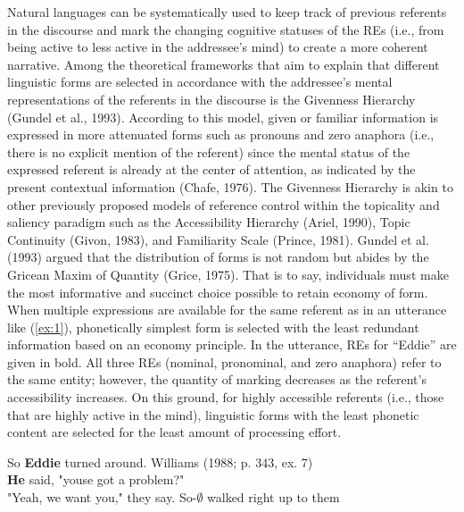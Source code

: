 \documentclass[]{elsarticle} %
\begin{document}
Natural languages can be systematically used to keep track of previous
referents in the discourse and mark the changing cognitive statuses of
the REs (i.e., from being active to less active in the addressee's mind)
to create a more coherent narrative. Among the theoretical frameworks
that aim to explain that different linguistic forms are selected in
accordance with the addressee's mental representations of the referents
in the discourse is the Givenness Hierarchy (Gundel et al., 1993).
According to this model, given or familiar information is expressed in
more attenuated forms such as pronouns and zero anaphora (i.e., there is
no explicit mention of the referent) since the mental status of the
expressed referent is already at the center of attention, as indicated
by the present contextual information (Chafe, 1976). The Givenness
Hierarchy is akin to other previously proposed models of reference
control within the topicality and saliency paradigm such as the
Accessibility Hierarchy (Ariel, 1990), Topic Continuity (Givon, 1983),
and Familiarity Scale (Prince, 1981). Gundel et al. (1993) argued that
the distribution of forms is not random but abides by the Gricean Maxim
of Quantity (Grice, 1975). That is to say, individuals must make the
most informative and succinct choice possible to retain economy of form.
When multiple expressions are available for the same referent as in an
utterance like (\ref{ex:1}), phonetically simplest form is selected with
the least redundant information based on an economy principle. In the
utterance, REs for ``Eddie'' are given in bold. All three REs (nominal,
pronominal, and zero anaphora) refer to the same entity; however, the
quantity of marking decreases as the referent's accessibility increases.
On this ground, for highly accessible referents (i.e., those that are
highly active in the mind), linguistic forms with the least phonetic
content are selected for the least amount of processing effort.

\begin{exe}
    \ex \label{ex:1}
    So \textbf{Eddie} turned around. \hfill Williams (1988; p. 343, ex. 7) \\
\textbf{He} said, "youse got a problem?" \\
"Yeah, we want you," they say.
So-$\pmb{\emptyset}$ walked right up to them \\
\end{exe}
\end{document}
